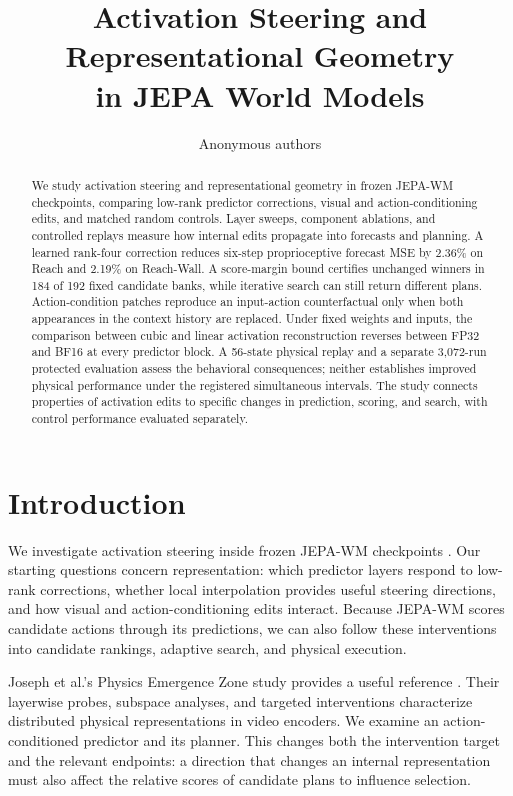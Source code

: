 \documentclass{article}
\title{Activation Steering and Representational Geometry\\in JEPA World Models}
\author{Anonymous authors}
\begin{document}
\raggedbottom
\maketitle

\begin{abstract}
We study activation steering and representational geometry in frozen JEPA-WM checkpoints, comparing low-rank predictor corrections, visual and action-conditioning edits, and matched random controls. Layer sweeps, component ablations, and controlled replays measure how internal edits propagate into forecasts and planning. A learned rank-four correction reduces six-step proprioceptive forecast MSE by 2.36\% on Reach and 2.19\% on Reach-Wall. A score-margin bound certifies unchanged winners in 184 of 192 fixed candidate banks, while iterative search can still return different plans. Action-condition patches reproduce an input-action counterfactual only when both appearances in the context history are replaced. Under fixed weights and inputs, the comparison between cubic and linear activation reconstruction reverses between FP32 and BF16 at every predictor block. A 56-state physical replay and a separate 3,072-run protected evaluation assess the behavioral consequences; neither establishes improved physical performance under the registered simultaneous intervals. The study connects properties of activation edits to specific changes in prediction, scoring, and search, with control performance evaluated separately.
\end{abstract}

\section{Introduction}

We investigate activation steering inside frozen JEPA-WM checkpoints \citep{terver2025jepawm}. Our starting questions concern representation: which predictor layers respond to low-rank corrections, whether local interpolation provides useful steering directions, and how visual and action-conditioning edits interact. Because JEPA-WM scores candidate actions through its predictions, we can also follow these interventions into candidate rankings, adaptive search, and physical execution.

Joseph et al.'s Physics Emergence Zone study provides a useful reference \citep{joseph2026interpretingphysics}. Their layerwise probes, subspace analyses, and targeted interventions characterize distributed physical representations in video encoders. We examine an action-conditioned predictor and its planner. This changes both the intervention target and the relevant endpoints: a direction that changes an internal representation must also affect the relative scores of candidate plans to influence selection.
\end{document}
